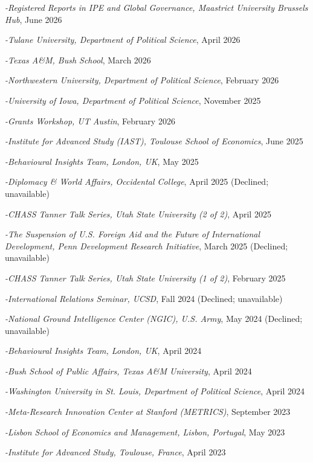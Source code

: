 \documentclass[10pt]{article}
\begin{document}
\singlespacing
\begin{etaremune}
\item\textit{-Registered Reports in IPE and Global Governance, Maastrict University Brussels Hub}, June 2026
\item\textit{-Tulane University, Department of Political Science}, April 2026
\item\textit{-Texas A\&M, Bush School}, March 2026
\item\textit{-Northwestern University, Department of Political Science}, February 2026
\item\textit{-University of Iowa, Department of Political Science}, November 2025
\item\textit{-Grants Workshop, UT Austin}, February 2026
\item\textit{-Institute for Advanced Study (IAST), Toulouse School of Economics}, June 2025
\item\textit{-Behavioural Insights Team, London, UK}, May 2025
\item\textit{-Diplomacy \& World Affairs, Occidental College}, April 2025 (Declined;  unavailable)
\item\textit{-CHASS Tanner Talk Series, Utah State University (2 of 2)}, April 2025
\item\textit{-The Suspension of U.S. Foreign Aid and the Future of International Development, Penn Development Research Initiative}, March 2025 (Declined; unavailable) 
\item\textit{-CHASS Tanner Talk Series, Utah State University (1 of 2)}, February 2025
\item\textit{-International Relations Seminar, UCSD}, Fall 2024 (Declined;  unavailable)
\item\textit{-National Ground Intelligence Center (NGIC), U.S. Army}, May 2024 (Declined;  unavailable)
\item\textit{-Behavioural Insights Team, London, UK}, April 2024
\item\textit{-Bush School of Public Affairs, Texas A\&M University}, April 2024
\item\textit{-Washington University in St. Louis, Department of Political Science}, April 2024 
\item\textit{-Meta-Research Innovation Center at Stanford (METRICS)}, September 2023 
\item\textit{-Lisbon School of Economics and Management, Lisbon, Portugal}, May 2023
\item\textit{-Institute for Advanced Study, Toulouse, France}, April 2023

\end{etaremune}
\end{document}
